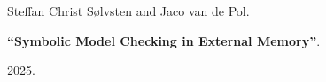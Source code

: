 Steffan Christ Sølvsten and Jaco van de Pol.

{\bf ``Symbolic Model Checking in External Memory''}.

2025.

\medskip

